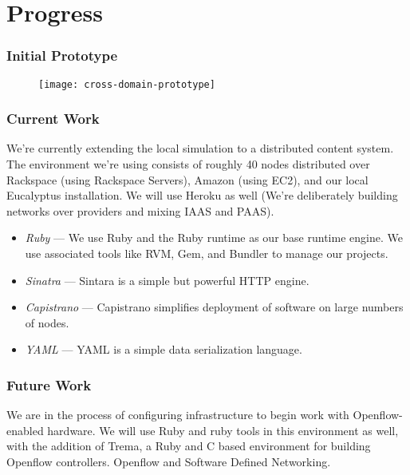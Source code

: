 \section{Progress}

\begin{frame}
\frametitle{Initial Prototype}
\begin{figure}
\centering
\texttt{[image: cross-domain-prototype]}
\label{fig:implementation:prototype}
\end{figure}
\end{frame}

\begin{frame}
\frametitle{Current Work}
We're currently extending the local simulation to a distributed content system.  The environment we're using consists of roughly 40 nodes distributed over Rackspace (using Rackspace Servers), Amazon (using EC2), and our local Eucalyptus installation.  We will use Heroku as well (We're deliberately building networks over providers and mixing IAAS and PAAS).
\newline
\pause
\begin{itemize}
\item \textit{Ruby} --- We use Ruby and the Ruby runtime as our base runtime engine.  We use associated tools like RVM, Gem, and Bundler to manage our projects.
\pause
\item \textit{Sinatra} --- Sintara is a simple but powerful HTTP engine.
\pause
\item \textit{Capistrano} --- Capistrano simplifies deployment of software on large numbers of nodes.
\pause
\item \textit{YAML} --- YAML is a simple data serialization language.
\end{itemize}
\end{frame}

\begin{frame}[c]
\frametitle{Future Work}
We are in the process of configuring infrastructure to begin work with Openflow-enabled hardware.  We will use Ruby and ruby tools in this environment as well, with the addition of Trema, a Ruby and C based environment for building Openflow controllers.
Openflow and Software Defined Networking.
\end{frame}
